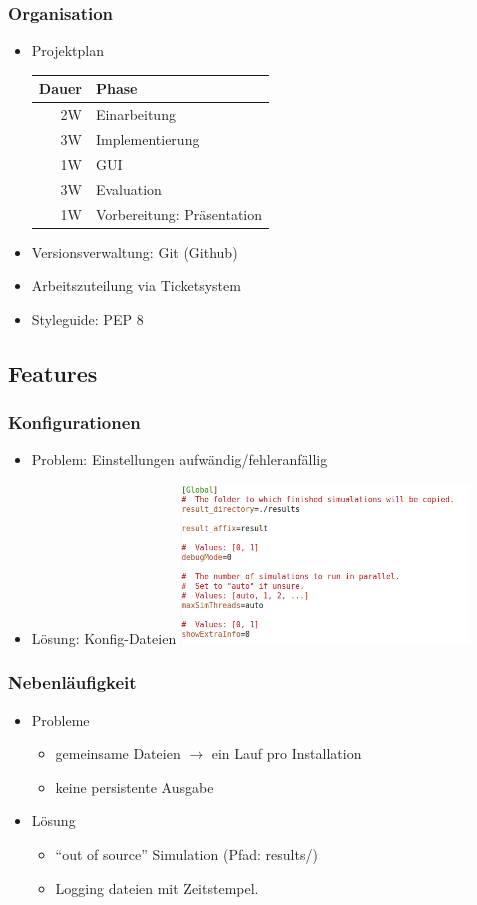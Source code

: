 \begin{frame}
  \frametitle{Organisation}
  \begin{itemize}
  \item Projektplan \\
    \begin{tabular}[H]{rl}
      Dauer & Phase \\ \hline
      2W & Einarbeitung \\
      3W & Implementierung \\
      1W & GUI \\
      3W & Evaluation \\
      1W & Vorbereitung: Präsentation
    \end{tabular}
  \item Versionsverwaltung: Git (Github)
  \item Arbeitszuteilung via Ticketsystem
  \item Styleguide: PEP 8
  \end{itemize}
\end{frame}

\subsection{Features}

\begin{frame}
  \frametitle{Konfigurationen}
  \begin{itemize}
  \item Problem: Einstellungen aufwändig/fehleranfällig
  \item<2-> Lösung: Konfig-Dateien
    \includegraphics[width=0.6\textwidth]{config-example.png}
  \end{itemize}
\end{frame}

\begin{frame}
  \frametitle{Nebenläufigkeit}

  \begin{itemize}
  \item Probleme
    \begin{itemize}
    \item gemeinsame Dateien $\rightarrow$ ein Lauf pro Installation
    \item keine persistente Ausgabe
    \end{itemize}
  \item<2-> Lösung
    \begin{itemize}
    \item ``out of source'' Simulation (Pfad: results/)
    \item Logging dateien mit Zeitstempel.
    \end{itemize}

  \end{itemize}
\end{frame}
